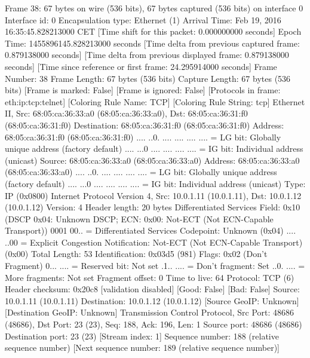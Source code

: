 Frame 38: 67 bytes on wire (536 bits), 67 bytes captured (536 bits) on interface 0
    Interface id: 0
    Encapsulation type: Ethernet (1)
    Arrival Time: Feb 19, 2016 16:35:45.828213000 CET
    [Time shift for this packet: 0.000000000 seconds]
    Epoch Time: 1455896145.828213000 seconds
    [Time delta from previous captured frame: 0.879138000 seconds]
    [Time delta from previous displayed frame: 0.879138000 seconds]
    [Time since reference or first frame: 24.295914000 seconds]
    Frame Number: 38
    Frame Length: 67 bytes (536 bits)
    Capture Length: 67 bytes (536 bits)
    [Frame is marked: False]
    [Frame is ignored: False]
    [Protocols in frame: eth:ip:tcp:telnet]
    [Coloring Rule Name: TCP]
    [Coloring Rule String: tcp]
Ethernet II, Src: 68:05:ca:36:33:a0 (68:05:ca:36:33:a0), Dst: 68:05:ca:36:31:f0 (68:05:ca:36:31:f0)
    Destination: 68:05:ca:36:31:f0 (68:05:ca:36:31:f0)
        Address: 68:05:ca:36:31:f0 (68:05:ca:36:31:f0)
        .... ..0. .... .... .... .... = LG bit: Globally unique address (factory default)
        .... ...0 .... .... .... .... = IG bit: Individual address (unicast)
    Source: 68:05:ca:36:33:a0 (68:05:ca:36:33:a0)
        Address: 68:05:ca:36:33:a0 (68:05:ca:36:33:a0)
        .... ..0. .... .... .... .... = LG bit: Globally unique address (factory default)
        .... ...0 .... .... .... .... = IG bit: Individual address (unicast)
    Type: IP (0x0800)
Internet Protocol Version 4, Src: 10.0.1.11 (10.0.1.11), Dst: 10.0.1.12 (10.0.1.12)
    Version: 4
    Header length: 20 bytes
    Differentiated Services Field: 0x10 (DSCP 0x04: Unknown DSCP; ECN: 0x00: Not-ECT (Not ECN-Capable Transport))
        0001 00.. = Differentiated Services Codepoint: Unknown (0x04)
        .... ..00 = Explicit Congestion Notification: Not-ECT (Not ECN-Capable Transport) (0x00)
    Total Length: 53
    Identification: 0x03d5 (981)
    Flags: 0x02 (Don't Fragment)
        0... .... = Reserved bit: Not set
        .1.. .... = Don't fragment: Set
        ..0. .... = More fragments: Not set
    Fragment offset: 0
    Time to live: 64
    Protocol: TCP (6)
    Header checksum: 0x20c8 [validation disabled]
        [Good: False]
        [Bad: False]
    Source: 10.0.1.11 (10.0.1.11)
    Destination: 10.0.1.12 (10.0.1.12)
    [Source GeoIP: Unknown]
    [Destination GeoIP: Unknown]
Transmission Control Protocol, Src Port: 48686 (48686), Dst Port: 23 (23), Seq: 188, Ack: 196, Len: 1
    Source port: 48686 (48686)
    Destination port: 23 (23)
    [Stream index: 1]
    Sequence number: 188    (relative sequence number)
    [Next sequence number: 189    (relative sequence number)]
